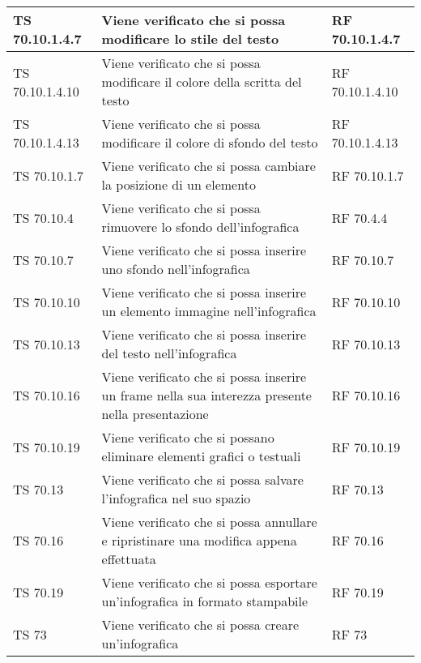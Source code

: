 {{\begin{longtable} [c]{| p{3cm} | p{6cm} |p{3cm}|}
			\hline
			TS 70.10.1.4.7 & Viene verificato che si possa modificare lo stile del testo & RF 70.10.1.4.7\\
			\hline
			TS 70.10.1.4.10 & Viene verificato che si possa modificare il colore della scritta del testo & RF 70.10.1.4.10\\
			\hline
			TS 70.10.1.4.13 & Viene verificato che si possa modificare il colore di sfondo del testo & RF 70.10.1.4.13\\
			\hline
			TS 70.10.1.7 & Viene verificato che si possa cambiare la posizione di un elemento & RF 70.10.1.7\\
			\hline
			TS 70.10.4 & Viene verificato che si possa rimuovere lo sfondo dell'infografica\ped{g} & RF 70.4.4\\
			\hline
			TS 70.10.7 & Viene verificato che si possa inserire uno sfondo nell'infografica\ped{g} & RF 70.10.7\\
			\hline
			TS 70.10.10 & Viene verificato che si possa inserire un elemento immagine nell'infografica\ped{g} & RF 70.10.10\\
			\hline
			TS 70.10.13 & Viene verificato che si possa inserire del testo nell'infografica\ped{g} & RF 70.10.13\\
			\hline
			TS 70.10.16 & Viene verificato che si possa inserire un frame\ped{g} nella sua interezza presente nella presentazione & RF 70.10.16\\
			\hline
			TS 70.10.19 & Viene verificato che si possano eliminare elementi grafici o testuali & RF 70.10.19\\
			\hline
			TS 70.13 & Viene verificato che si possa salvare l'infografica\ped{g} nel suo spazio & RF 70.13\\
			\hline
			TS 70.16 & Viene verificato che si possa annullare e ripristinare una modifica appena effettuata & RF 70.16\\
			\hline
			TS 70.19 & Viene verificato che si possa esportare un'infografica\ped{g} in formato stampabile & RF 70.19\\
			\hline
			TS 73 & Viene verificato che si possa creare un'infografica\ped{g} & RF 73\\
			\hline
\end{longtable}

}}
